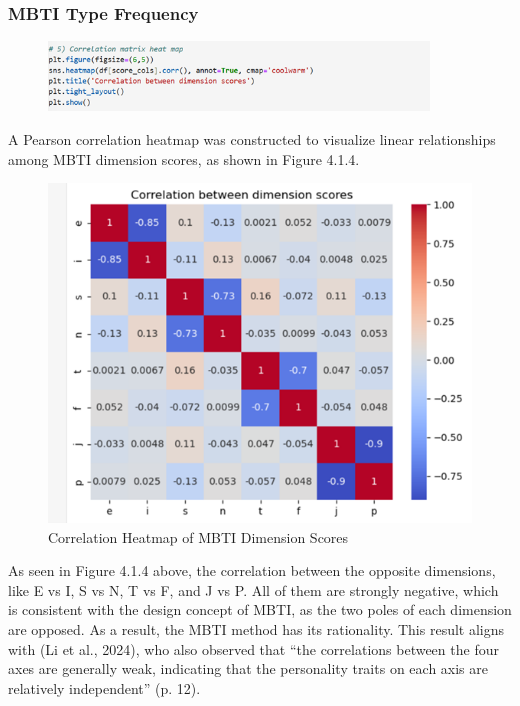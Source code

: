 \documentclass[12pt]{article}
\begin{document}
	\subsubsection{MBTI Type Frequency}
	\begin{figure}[H]
		\centering
		\includegraphics[width=0.9\textwidth]{Q1EDA8}
		
	\end{figure}	
	A Pearson correlation heatmap was constructed to visualize linear relationships among MBTI dimension scores, as shown in Figure 4.1.4.
	\begin{figure}[H]
		\centering
		\includegraphics{Q1EDA9} 
		\caption{Correlation Heatmap of MBTI Dimension Scores}		
	\end{figure}
	
	As seen in Figure 4.1.4 above, the correlation between the opposite dimensions, like E vs I, S vs N, T vs F, and J vs P. All of them are strongly negative, which is consistent with the design concept of MBTI, as the two poles of each dimension are opposed. As a result, the MBTI method has its rationality. This result aligns with (Li et al., 2024), who also observed that “the correlations between the four axes are generally weak, indicating that the personality traits on each axis are relatively independent” (p. 12).
	
\end{document}
